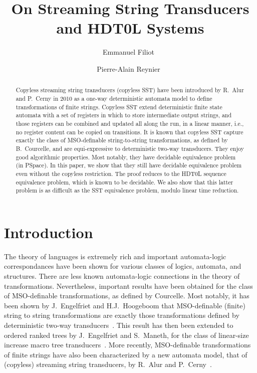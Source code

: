 \documentclass{llncs}
\begin{document}
\title{On Streaming String Transducers and HDT0L Systems}
\author{Emmanuel Filiot~ \and Pierre-Alain Reynier~}

\maketitle


\begin{abstract}
    Copyless streaming string transducers (copyless SST) have been
    introduced by R.~Alur and
    P.~Cerny in 2010 as a one-way deterministic automata model to define
    transformations of finite strings. Copyless SST extend deterministic finite state automata
    with a set of registers in which to store intermediate output
    strings, and those registers can be combined and updated all along
    the run, in a linear manner, i.e., no register content can be
    copied on transitions. It is known that copyless SST capture exactly the class of
    MSO-definable string-to-string transformations, as defined by B.~Courcelle, and are
    equi-expressive to deterministic two-way transducers. They enjoy
    good algorithmic properties. Most notably, they have decidable
    equivalence problem (in \textsf{PSpace}). In this paper, we show
    that they still have decidable equivalence problem even without
    the copyless restriction. The proof reduces to the HDT0L sequence
    equivalence problem, which is known to be decidable. We also show
    that this latter problem is as difficult as the SST equivalence
    problem, modulo linear time reduction. 
\end{abstract}

\section{Introduction}

The theory of languages is extremely rich and important automata-logic
correspondances have been shown for various classes of logics, automata,
and structures. There are less known automata-logic connections in the
theory of transformations. Nevertheless, important results have been
obtained for the class of MSO-definable transformations, as defined by
Courcelle. Most notably, it has been shown by J.~Engelfriet and
H.J.~Hoogeboom that MSO-definable (finite) string to string
transformations are exactly those transformations defined by 
deterministic two-way transducers~\cite{EH01}. This result has then been extended to 
ordered ranked trees by J.~Engelfriet and S.~Maneth, for the class of
linear-size increase macro tree transducers~\cite{MTT}. More recently,
MSO-definable transformations of finite strings have also been
characterized by a new automata model, that of (copyless) streaming
string transducers, by R.~Alur and P.~Cerny~\cite{AC10}. 
\end{document}

